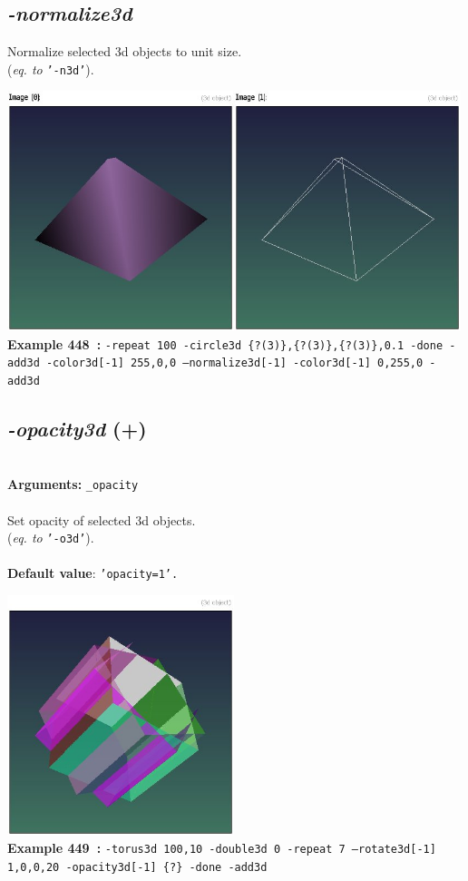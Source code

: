 \documentclass[a4paper,11pt,twoside]{book}
\begin{document}
\subsection{\emph{-normalize3d} }\vspace*{-0.5em}
Normalize selected 3d objects to unit size.
~\\(\emph{eq. to} {\small \texttt{'-n3d'}}).
\begin{center}\includegraphics[keepaspectratio=true,height=7cm,width=\textwidth]{img/gmic_def448.jpg}\\
{\footnotesize \textbf{Example 448~:} \texttt{-repeat 100 -circle3d \{?(3)\},\{?(3)\},\{?(3)\},0.1 -done -add3d -color3d[-1] 255,0,0 --normalize3d[-1] -color3d[-1] 0,255,0 -add3d}}
\end{center}

\subsection{\emph{-opacity3d} (+)}\vspace*{-0.5em}
~\\\textbf{Arguments: } 
{\small \texttt{\_opacity}}\\~\\
Set opacity of selected 3d objects.
~\\(\emph{eq. to} {\small \texttt{'-o3d'}}).
~\\~\\\textbf{Default value}: {\small \texttt{'opacity=1'.}}
\begin{center}\includegraphics[keepaspectratio=true,height=7cm,width=\textwidth]{img/gmic_def449.jpg}\\
{\footnotesize \textbf{Example 449~:} \texttt{-torus3d 100,10 -double3d 0 -repeat 7 --rotate3d[-1] 1,0,0,20 -opacity3d[-1] \{?\} -done -add3d}}
\end{center}
\end{document}
